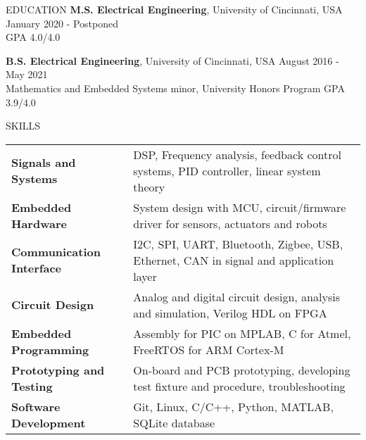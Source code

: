 \documentclass{../lib/resume} %
\begin{document}

\begin{rSection}{EDUCATION}
    {\bf M.S. Electrical Engineering}, University of Cincinnati, USA \hfill {January 2020 - Postponed} \\
    \null \hfill GPA 4.0/4.0 \smallskip

    {\bf B.S. Electrical Engineering}, University of Cincinnati, USA \hfill {August 2016 - May 2021}\\
    Mathematics and Embedded Systems minor, University Honors Program \hfill {GPA 3.9/4.0}



\end{rSection}

\begin{rSection}{SKILLS}

    \begin{tabular}{ @{} >{\bfseries}l @{\hspace{2ex}} l }
        Signals and Systems     & DSP, Frequency analysis, feedback control systems, PID controller, linear system theory       \\
        Embedded Hardware       & System design with MCU, circuit/firmware driver for sensors, actuators and robots \\
        Communication Interface & I2C, SPI, UART, Bluetooth, Zigbee, USB, Ethernet, CAN in signal and application layer \\
        Circuit Design          & Analog and digital circuit design, analysis and simulation, Verilog HDL on FPGA               \\
        Embedded Programming    & Assembly for PIC on MPLAB, C for Atmel, FreeRTOS for ARM Cortex-M                   \\
        Prototyping and Testing & On-board and PCB prototyping, developing test fixture and procedure, troubleshooting          \\
        Software Development    & Git, Linux, C/C++, Python, MATLAB, SQLite database                                             \\
    \end{tabular}
\end{rSection}
\end{document}
